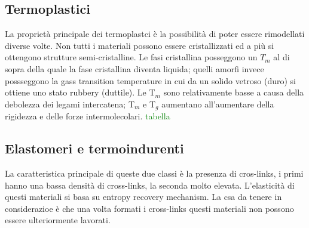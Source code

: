 \subsection{Termoplastici}
La proprietà principale dei termoplastci è la possibilità di poter essere rimodellati diverse volte. Non tutti i materiali possono essere cristallizzati ed a più si ottengono strutture semi-cristalline. Le fasi cristallina posseggono un $T_m$ al di sopra della quale la fase cristallina diventa liquida; quelli amorfi invece possseggono la gass transition temperature in cui da un solido vetroso (duro) si ottiene uno stato rubbery (duttile). Le T$_m$ sono relativamente basse a causa della debolezza dei legami intercatena; T$_m$ e T$_g$ aumentano all'aumentare della rigidezza e delle forze intermolecolari.
\textcolor{green}{tabella}
\subsection{Elastomeri e termoindurenti}
La caratteristica principale di queste due classi è la presenza di cros-links, i primi hanno una bassa densità di cross-links, la seconda molto elevata. L'elasticità di questi materiali si basa su  entropy recovery mechanism. La csa da tenere in considerazioe è che una volta formati i cross-links questi materiali non possono essere ulteriormente lavorati.

